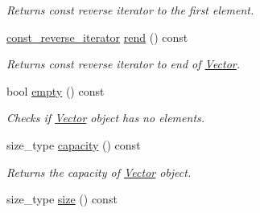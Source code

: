 \begin{DoxyCompactItemize}
\begin{DoxyCompactList}\small\item\em Returns const reverse iterator to the first element. \end{DoxyCompactList}\item 
\hyperlink{classtasks_1_1Vector_1_1Reverse__iterator}{const\+\_\+reverse\+\_\+iterator} \hyperlink{classtasks_1_1Vector_aa27f61d7e0e1b3246f8d637c1d92bb0d}{rend} () const \hypertarget{classtasks_1_1Vector_aa27f61d7e0e1b3246f8d637c1d92bb0d}{}\label{classtasks_1_1Vector_aa27f61d7e0e1b3246f8d637c1d92bb0d}

\begin{DoxyCompactList}\small\item\em Returns const reverse iterator to end of \hyperlink{classtasks_1_1Vector}{Vector}. \end{DoxyCompactList}\item 
bool \hyperlink{classtasks_1_1Vector_addbb3e001ad9c5b42fc7ccec166badf4}{empty} () const \hypertarget{classtasks_1_1Vector_addbb3e001ad9c5b42fc7ccec166badf4}{}\label{classtasks_1_1Vector_addbb3e001ad9c5b42fc7ccec166badf4}

\begin{DoxyCompactList}\small\item\em Checks if \hyperlink{classtasks_1_1Vector}{Vector} object has no elements. \end{DoxyCompactList}\item 
size\+\_\+type \hyperlink{classtasks_1_1Vector_a6d3feef0df6d8e4d963da2f4bc7c9d2c}{capacity} () const \hypertarget{classtasks_1_1Vector_a6d3feef0df6d8e4d963da2f4bc7c9d2c}{}\label{classtasks_1_1Vector_a6d3feef0df6d8e4d963da2f4bc7c9d2c}

\begin{DoxyCompactList}\small\item\em Returns the capacity of \hyperlink{classtasks_1_1Vector}{Vector} object. \end{DoxyCompactList}\item 
size\+\_\+type \hyperlink{classtasks_1_1Vector_a3793b4b5772a903210a8592084e12890}{size} () const \hypertarget{classtasks_1_1Vector_a3793b4b5772a903210a8592084e12890}{}\label{classtasks_1_1Vector_a3793b4b5772a903210a8592084e12890}


\end{DoxyCompactItemize}
